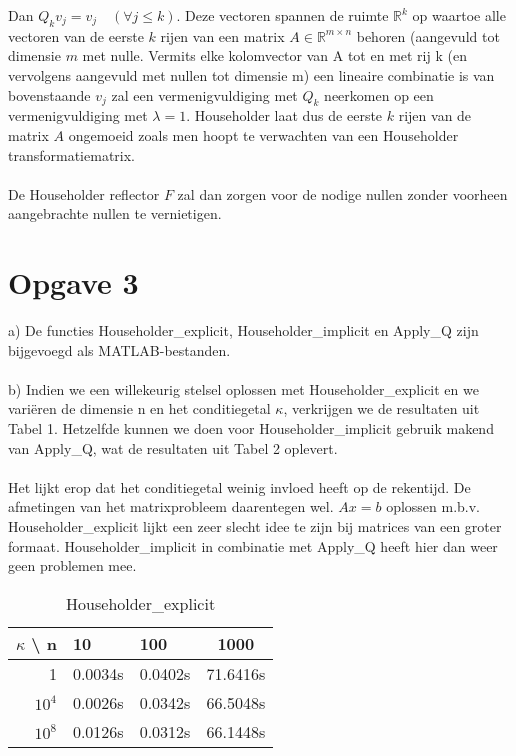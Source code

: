 \documentclass[a4paper]{article}
\newcommand{\opgave}[1]{\section*{Opgave #1}}
\begin{document}
Dan $Q_k v_j = v_j \quad(\forall j \leq k)$.
Deze vectoren spannen de ruimte $\mathbb{R}^k$ op waartoe alle vectoren
van de eerste $k$ rijen van een matrix $A \in \mathbb{R}^{m \times n}$ behoren (aangevuld tot dimensie $m$ met nulle. 
Vermits elke kolomvector van A tot en met rij k (en vervolgens aangevuld met nullen tot dimensie m) een lineaire combinatie is van bovenstaande $v_j$ zal een vermenigvuldiging met $Q_k$ neerkomen op een vermenigvuldiging met $\lambda = 1$. Householder laat dus de eerste $k$ rijen van de matrix $A$ ongemoeid zoals men hoopt te verwachten van een Householder transformatiematrix.\\
\\
De Householder reflector $F$ zal dan zorgen voor de nodige nullen zonder voorheen aangebrachte nullen te vernietigen.

\pagebreak

\opgave{3}

a) De functies Householder\_explicit, Householder\_implicit en Apply\_Q zijn bijgevoegd als MATLAB-bestanden. \\
\\
b) Indien we een willekeurig stelsel oplossen met Householder\_explicit en we variëren de dimensie n en het conditiegetal $\kappa$, verkrijgen we de resultaten uit Tabel 1. Hetzelfde kunnen we doen voor Householder\_implicit gebruik makend van Apply\_Q, wat de resultaten uit Tabel 2 oplevert.\\
\\
Het lijkt erop dat het conditiegetal weinig invloed heeft op de rekentijd. De afmetingen van het matrixprobleem daarentegen wel. $Ax = b$ oplossen m.b.v. Householder\_explicit lijkt een zeer slecht idee te zijn bij matrices van een groter formaat. Householder\_implicit in combinatie met Apply\_Q heeft hier dan weer geen problemen mee.

\begin{table}
\begin{center}
\begin{tabular}{r|llc}
$\kappa$ \textbackslash{} n & 10 & 100 & 1000 \\\hline
1 & 0.0034s & 0.0402s & 71.6416s \\
$10^4$ & 0.0026s & 0.0342s & 66.5048s \\
$10^8$ & 0.0126s & 0.0312s & 66.1448s
\end{tabular}
\end{center}
\caption{Householder\_explicit}
\label{tab1}
\end{table}
\end{document}
